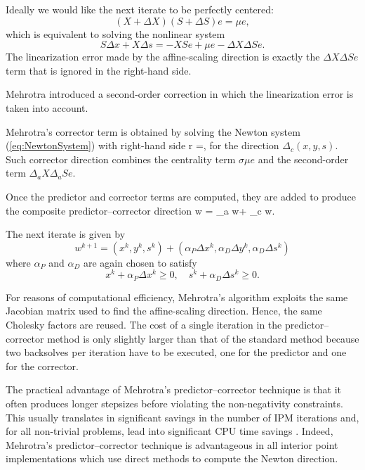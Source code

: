 Ideally we would like the next iterate to be perfectly centered: 
\[
  (X+\Delta X)(S+\Delta S)e=\mu e,
\]
which is equivalent to solving the nonlinear system
\[
  S\Delta x + X\Delta s = -XSe +\mu e - \Delta X\Delta Se.
\]
The linearization error made by the affine-scaling direction is exactly 
the $\Delta X\Delta Se$ term that is ignored in the right-hand side.


Mehrotra introduced a second-order correction in which the 
linearization error is taken into account. 

Mehrotra's corrector term is obtained by solving the Newton system 
(\ref{eq:NewtonSystem}) with right-hand side
\be \label{eq:MehrotraRhs}
r =,
\ee
for the direction $\Delta_c (x,y,s)$.
Such corrector direction combines the centrality term $\sigma \mu e$
and the second-order term $\Delta_a X\Delta_a Se$.

Once the predictor and corrector terms are computed, they are 
added to produce the composite predictor--corrector direction
\be \label{eq:CompositeDirection}
\Delta w = \Delta_a w+ \Delta_c w.
\ee

The next iterate is given by
\[
w^{k+1} = (x^k,y^k,s^k)
        + (\alpha_P\Delta x^k,\alpha_D\Delta y^k,\alpha_D\Delta s^k)
\]
where $\alpha_P$ and $\alpha_D$ are again chosen to satisfy
\[
x^k+\alpha_P\Delta x^k \ge 0, \quad s^k+\alpha_D\Delta s^k \ge 0.
\]

For reasons of computational efficiency, Mehrotra's algorithm exploits 
the same Jacobian matrix used to find the affine-scaling direction. 
Hence, the same Cholesky factors are reused.
The cost of a single iteration in the predictor--corrector 
method is only slightly larger than that of the standard 
method because two backsolves per iteration have to be executed, 
one for the predictor and one for the corrector. 

The practical advantage of Mehrotra's predictor--corrector technique
is that it often produces longer stepsizes before violating the 
non-negativity constraints.
%
This usually translates in significant savings in the number of IPM 
iterations and, for all non-trivial problems, lead into significant 
CPU time savings \cite{LustigMarstenShanno,Mehrotra92}. Indeed, 
Mehrotra's predictor--corrector technique is advantageous in all 
interior point implementations which use direct methods to compute 
the Newton direction.

